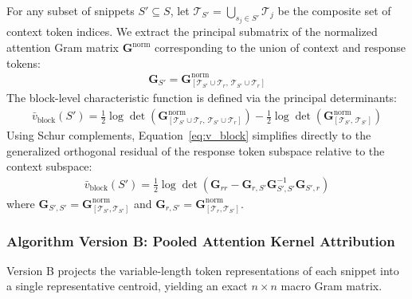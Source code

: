 \documentclass{article}
\begin{document}
For any subset of snippets $S' \subseteq S$, let $\mathcal{T}_{S'} = \bigcup_{s_j \in S'} \mathcal{T}_j$ be the composite set of context token indices. We extract the principal submatrix of the normalized attention Gram matrix $\mathbf{G}^{\text{norm}}$ corresponding to the union of context and response tokens:
\begin{align}
    \mathbf{G}_{S'} = \mathbf{G}^{\text{norm}}_{[\mathcal{T}_{S'} \cup \mathcal{T}_r, \, \mathcal{T}_{S'} \cup \mathcal{T}_r]}
\end{align}
The block-level characteristic function is defined via the principal determinants:
\begin{align}\label{eq:v_block}
    \bar{v}_{\text{block}}(S') = \frac{1}{2} \log \det \left( \mathbf{G}^{\text{norm}}_{[\mathcal{T}_{S'} \cup \mathcal{T}_r, \, \mathcal{T}_{S'} \cup \mathcal{T}_r]} \right) - \frac{1}{2} \log \det \left( \mathbf{G}^{\text{norm}}_{[\mathcal{T}_{S'}, \, \mathcal{T}_{S'}]} \right)
\end{align}
Using Schur complements, Equation~\eqref{eq:v_block} simplifies directly to the generalized orthogonal residual of the response token subspace relative to the context subspace:
\begin{align}
    \bar{v}_{\text{block}}(S') = \frac{1}{2} \log \det \left( \mathbf{G}_{rr} - \mathbf{G}_{r, S'} \mathbf{G}_{S', S'}^{-1} \mathbf{G}_{S', r} \right)
\end{align}
where $\mathbf{G}_{S', S'} = \mathbf{G}^{\text{norm}}_{[\mathcal{T}_{S'}, \mathcal{T}_{S'}]}$ and $\mathbf{G}_{r, S'} = \mathbf{G}^{\text{norm}}_{[\mathcal{T}_r, \mathcal{T}_{S'}]}$.

\subsubsection{Algorithm Version B: Pooled Attention Kernel Attribution}
Version B projects the variable-length token representations of each snippet into a single representative centroid, yielding an exact $n \times n$ macro Gram matrix.
\end{document}
